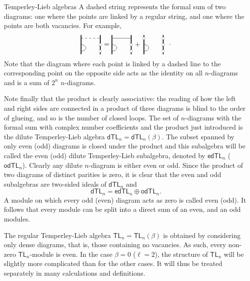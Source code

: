 \documentclass[reqno]{amsart}
\newcommand{\vac}[1]{\draw (#1) circle (1/5);
 	\fill[white] (#1) circle (1/5)}
\newcommand{\defect}[1]{\draw (#1) --++ (3,0)}
\newcommand{\bord}[2]{\draw[very thick] (#1,-1/2) --++ (0,#2)}
\newcommand{\link}[4]{\draw (#1) .. controls (#2) and (#3) .. (#4)}
\newcommand{\wave}[2]{\draw[dashed] (#1,#2) --++ (3,0);}
\newcommand{\dtl}[1]{\mathsf{dTL}_{#1}}
\newcommand{\odtl}[1]{\mathsf{odTL}_{#1}}
\newcommand{\edtl}[1]{\mathsf{edTL}_{#1}}
\newcommand{\tl}[1]{\mathsf{TL}_{#1}}
\begin{document}
\begin{section}{Temperley-Lieb algebras}
A dashed string represents the formal sum of two diagrams: one where the points are linked by a regular string, and one where the points are both vacancies. For example,
%
\begin{equation*}
\begin{tikzpicture}[baseline={(current bounding box.center)},scale=1/3]
%
	\bord{0}{3};
	\bord{3}{3};
	\link{0,0}{1,0}{1,1}{0,1};
	\wave{0}{2}
	\vac{3,0};
	\vac{3,1};
	\node at (4,1) {$=$};
%	
\end{tikzpicture}
\begin{tikzpicture}[baseline={(current bounding box.center)},scale=1/3]
%
	\bord{0}{3};
	\bord{3}{3};
	\link{0,0}{1,0}{1,1}{0,1};
	\defect{0,2};
	\vac{3,0};
	\vac{3,1};
%	
	\node at (4,1) {$+$};
%	
	\bord{5}{3};
	\bord{8}{3};
	\link{5,0}{6,0}{6,1}{5,1};
	\vac{5,2};
	\vac{8,2};
	\vac{8,0};
	\vac{8,1};
%	
\end{tikzpicture}\ \ .
\end{equation*}
Note that the diagram where each point is linked by a dashed line to the corresponding point on the opposite side acts as the identity on all $n$-diagrams and is a sum of $2^n$ $n$-diagrams.

Note finally that the product is clearly associative: the reading of how the left and right sides are connected in a product of three diagrams is blind to the order of glueing, and so is the number of closed loops. The set of $n$-diagrams with the formal sum with complex number coefficients and the product just introduced is the dilute Temperley-Lieb algebra $\dtl{n}=\dtl{n}(\beta)$. The subset spanned by only even (odd) diagrams is closed under the product and this subalgebra will be called the even (odd) dilute Temperley-Lieb subalgebra, denoted by $\edtl{n}$ ($\odtl{n}$).  Clearly any dilute $n$-diagram is either even or odd. Since the product of two diagrams of distinct parities is zero, it is clear that the even and odd subalgebras are two-sided ideals of $\dtl{n}$ and
$$\dtl n=\edtl n\oplus \odtl n.$$
A module on which every odd (even) diagram acts as zero is called even (odd). It follows that every module can be split into a direct sum of an even, and an odd modules. 

The regular Temperley-Lieb algebra $\tl{n} = \tl{n}(\beta)$ is obtained by considering only dense diagrams, that is, those containing no vacancies. As such, every non-zero $\tl{n}$-module is even. In the case $\beta =0 $ ($\ell = 2$), the structure of $\tl{n}$ will be slightly more complicated than for the other cases. It will thus be treated separately in many calculations and definitions.


\end{section}
\end{document}
